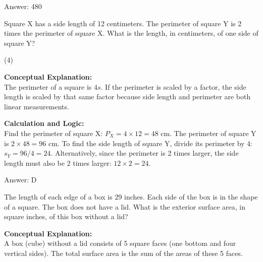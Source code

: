 \documentclass[11pt,paper=a4,answers]{exam}
\begin{document}
\begin{questions}
\begin{solution}
Answer: \colorbox{yellow!100}{480}
\end{solution}

\vspace{60pt}

\question
Square X has a side length of 12 centimeters. The perimeter of square Y is 2 times the perimeter of square X. What is the length, in centimeters, of one side of square Y?
\begin{tasks}(4)
\end{tasks}

\begin{solution}
\textbf{Conceptual Explanation:} \\
The perimeter of a square is $4s$. If the perimeter is scaled by a factor, the side length is scaled by that same factor because side length and perimeter are both linear measurements.

\vspace{30pt}

\textbf{Calculation and Logic:} \\
Find the perimeter of square X: $P_X = 4 \times 12 = 48 \text{ cm}$. The perimeter of square Y is $2 \times 48 = 96 \text{ cm}$. To find the side length of square Y, divide its perimeter by 4: $s_Y = 96 / 4 = 24$. Alternatively, since the perimeter is 2 times larger, the side length must also be 2 times larger: $12 \times 2 = 24$.

\vspace{30pt}

Answer: \colorbox{yellow!100}{D}
\end{solution}

\vspace{60pt}

\question
The length of each edge of a box is 29 inches. Each side of the box is in the shape of a square. The box does not have a lid. What is the exterior surface area, in square inches, of this box without a lid?

\begin{solution}
\textbf{Conceptual Explanation:} \\
A box (cube) without a lid consists of 5 square faces (one bottom and four vertical sides). The total surface area is the sum of the areas of these 5 faces.

\vspace{30pt}


\end{solution}
\end{questions}
\end{document}
